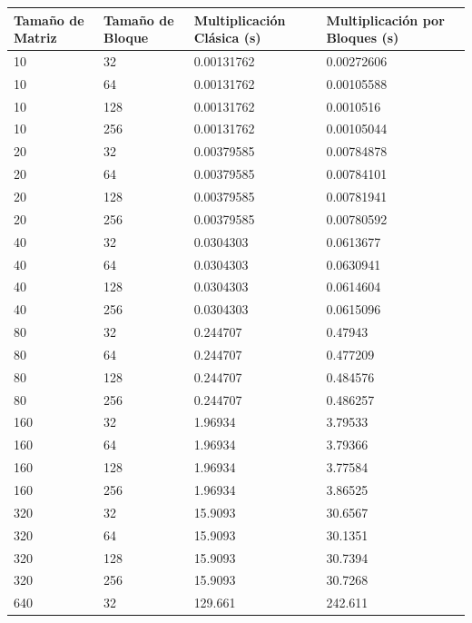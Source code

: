 \documentclass[conference]{IEEEtran}
\begin{document}
\begin{table}[h!]
    \centering
    \begin{tabularx}{220pt}{|X|X|X|X|}
    \hline
    \textbf{Tamaño de Matriz} & \textbf{Tamaño de Bloque} & \textbf{Multiplicación Clásica (s)} & \textbf{Multiplicación por Bloques (s)} \\ \hline
    10   & 32  & 0.00131762  & 0.00272606  \\ \hline
    10   & 64  & 0.00131762  & 0.00105588  \\ \hline
    10   & 128 & 0.00131762  & 0.0010516   \\ \hline
    10   & 256 & 0.00131762  & 0.00105044  \\ \hline
    20   & 32  & 0.00379585  & 0.00784878  \\ \hline
    20   & 64  & 0.00379585  & 0.00784101  \\ \hline
    20   & 128 & 0.00379585  & 0.00781941  \\ \hline
    20   & 256 & 0.00379585  & 0.00780592  \\ \hline
    40   & 32  & 0.0304303   & 0.0613677   \\ \hline
    40   & 64  & 0.0304303   & 0.0630941   \\ \hline
    40   & 128 & 0.0304303   & 0.0614604   \\ \hline
    40   & 256 & 0.0304303   & 0.0615096   \\ \hline
    80   & 32  & 0.244707    & 0.47943     \\ \hline
    80   & 64  & 0.244707    & 0.477209    \\ \hline
    80   & 128 & 0.244707    & 0.484576    \\ \hline
    80   & 256 & 0.244707    & 0.486257    \\ \hline
    160  & 32  & 1.96934     & 3.79533     \\ \hline
    160  & 64  & 1.96934     & 3.79366     \\ \hline
    160  & 128 & 1.96934     & 3.77584     \\ \hline
    160  & 256 & 1.96934     & 3.86525     \\ \hline
    320  & 32  & 15.9093     & 30.6567     \\ \hline
    320  & 64  & 15.9093     & 30.1351     \\ \hline
    320  & 128 & 15.9093     & 30.7394     \\ \hline
    320  & 256 & 15.9093     & 30.7268     \\ \hline
    640  & 32  & 129.661     & 242.611     \\ \hline

\end{tabularx}
\end{table}
\end{document}
